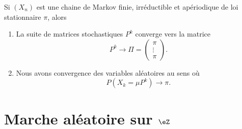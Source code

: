 \begin{theorem}     \label{ThoQSuLZoz}
	Si \( (X_n)\) est une chaine de Markov finie, irréductible et apériodique de loi stationnaire \( \pi\), alors
	\begin{enumerate}
		\item
		      La suite de matrices stochastiques \( P^k\) converge vers la matrice
		      \begin{equation}
			      P^k\to\Pi=\begin{pmatrix}
				      \pi    \\
				      \vdots \\
				      \pi
			      \end{pmatrix}.
		      \end{equation}
		\item
		      Nous avons convergence des variables aléatoires au sens où
		      \begin{equation}
			      P(X_k=\mu P^k)\to \pi.
		      \end{equation}
	\end{enumerate}
\end{theorem}

\section{Marche aléatoire sur \texorpdfstring{\( \eZ\)}{Z}}


